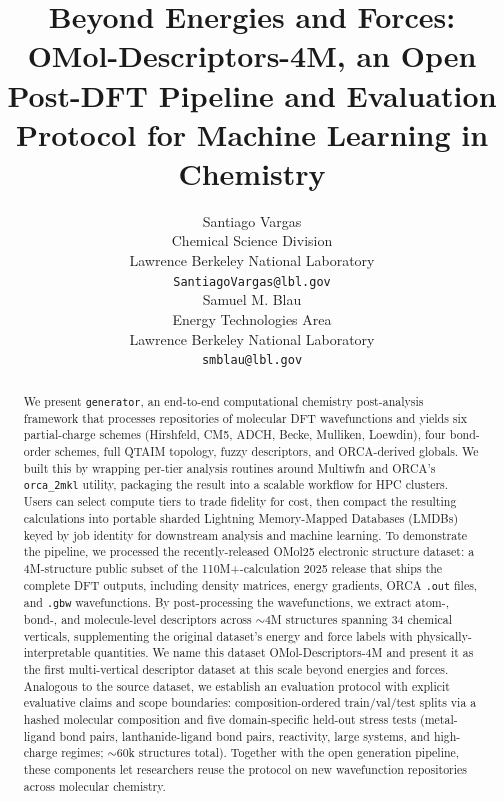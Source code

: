 \documentclass{article}
\title{Beyond Energies and Forces: OMol-Descriptors-4M, an Open
  Post-DFT Pipeline and Evaluation Protocol for Machine Learning in Chemistry}
\author{%
  Santiago Vargas \\
  Chemical Science Division \\
  Lawrence Berkeley National Laboratory \\
  \texttt{SantiagoVargas@lbl.gov} \\
  \And
  Samuel M. Blau \\
  Energy Technologies Area \\
  Lawrence Berkeley National Laboratory \\
  \texttt{smblau@lbl.gov} \\
}
\newcommand{\revised}[1]{\textcolor{revcolor}{#1}}
\begin{document}
\maketitle

\begin{abstract}


We present \texttt{generator}, an end-to-end computational chemistry
post-analysis framework that processes repositories of molecular DFT wavefunctions
and yields six partial-charge schemes (Hirshfeld, CM5, ADCH, Becke, Mulliken, Loewdin), 
four bond-order schemes, full QTAIM
topology, fuzzy descriptors, and ORCA-derived globals. We built this by
wrapping per-tier analysis routines around Multiwfn and ORCA's \texttt{orca\_2mkl}
utility, packaging the result into a scalable workflow for HPC clusters.
Users can select compute tiers to trade fidelity for cost, then compact
the resulting calculations into portable sharded Lightning Memory-Mapped
Databases (LMDBs) keyed by job identity for downstream analysis and
machine learning.
To demonstrate the pipeline, we processed the recently-released OMol25
electronic structure dataset: a 4M-structure public subset of the
110M+-calculation 2025 release that ships the complete DFT outputs,
including density matrices, energy gradients, ORCA \texttt{.out} files, and
\texttt{.gbw} wavefunctions. By post-processing the wavefunctions, we extract
atom-, bond-, and molecule-level descriptors across $\sim$4M structures
spanning 34 chemical verticals, supplementing the original dataset's energy
and force labels with physically-interpretable quantities.
We name this dataset OMol-Descriptors-4M and present it as the first
multi-vertical descriptor dataset at this scale beyond energies and forces.
Analogous to the source dataset, we establish an evaluation protocol with
explicit evaluative claims and scope boundaries: composition-ordered
train/val/test splits via \revised{a hashed molecular composition} and five
domain-specific held-out stress tests (metal-ligand bond pairs, lanthanide-ligand
bond pairs, reactivity, large systems, and high-charge regimes; $\sim$60k
structures total). Together with the open
generation pipeline, these components let researchers reuse the protocol
on new wavefunction repositories across molecular chemistry.

\end{abstract}









\end{document}
